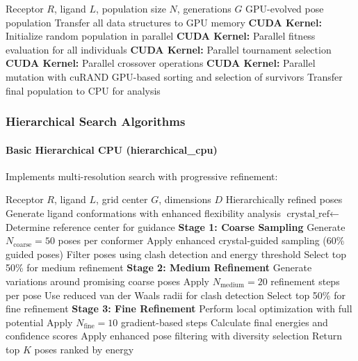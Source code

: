 \documentclass[11pt,a4paper]{article}
\begin{document}
\begin{algorithm}[H]
\caption{CUDA Genetic Algorithm Docking}
\begin{algorithmic}[1]
\Require Receptor $R$, ligand $L$, population size $N$, generations $G$
\Ensure GPU-evolved pose population
\State Transfer all data structures to GPU memory
\State \textbf{CUDA Kernel:} Initialize random population in parallel
    \State \textbf{CUDA Kernel:} Parallel fitness evaluation for all individuals
    \State \textbf{CUDA Kernel:} Parallel tournament selection
    \State \textbf{CUDA Kernel:} Parallel crossover operations
    \State \textbf{CUDA Kernel:} Parallel mutation with cuRAND
    \State GPU-based sorting and selection of survivors
\EndFor
\State Transfer final population to CPU for analysis
\end{algorithmic}
\end{algorithm}

\subsubsection{Hierarchical Search Algorithms}

\paragraph{Basic Hierarchical CPU (hierarchical\_cpu)}

Implements multi-resolution search with progressive refinement:

\begin{algorithm}[H]
\caption{Hierarchical CPU Docking}
\begin{algorithmic}[1]
\Require Receptor $R$, ligand $L$, grid center $G$, dimensions $D$
\Ensure Hierarchically refined poses
\State Generate ligand conformations with enhanced flexibility analysis
\State $\text{crystal\_ref} \leftarrow$ Determine reference center for guidance
\State \textbf{Stage 1: Coarse Sampling}
\State Generate $N_{\text{coarse}} = 50$ poses per conformer
\State Apply enhanced crystal-guided sampling (60\% guided poses)
\State Filter poses using clash detection and energy threshold
\State Select top 50\% for medium refinement
\State \textbf{Stage 2: Medium Refinement}
\State Generate variations around promising coarse poses
\State Apply $N_{\text{medium}} = 20$ refinement steps per pose
\State Use reduced van der Waals radii for clash detection
\State Select top 50\% for fine refinement
\State \textbf{Stage 3: Fine Refinement}
\State Perform local optimization with full potential
\State Apply $N_{\text{fine}} = 10$ gradient-based steps
\State Calculate final energies and confidence scores
\State Apply enhanced pose filtering with diversity selection
\State Return top $K$ poses ranked by energy
\end{algorithmic}
\end{algorithm}
\end{document}
